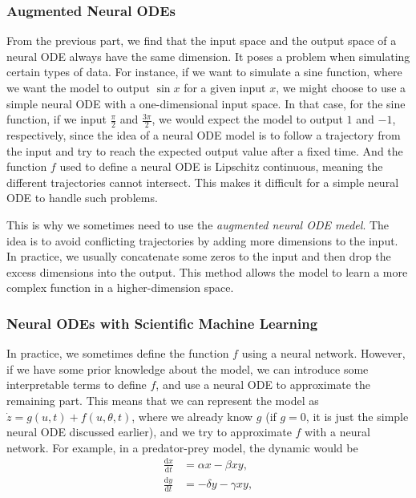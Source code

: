\documentclass[a4paper,11pt,titlepage]{article}
\theoremstyle{definition}
\theoremstyle{plain}
\theoremstyle{remark}
\begin{document}
\subsubsection{Augmented Neural ODEs}

From the previous part, we find that the input space and the output space of a neural ODE always have the same dimension. It poses a problem when simulating certain types of data. For instance, if we want to simulate a sine function, where we want the model to output $\sin x$ for a given input $x$, we might choose to use a simple neural ODE with a one-dimensional input space. In that case, for the sine function, if we input $\frac{\pi}{2}$ and $\frac{3\pi}{2}$, we would expect the model to output $1$ and $-1$, respectively, since the idea of a neural ODE model is to follow a trajectory from the input and try to reach the expected output value after a fixed time. And the function $f$ used to define a neural ODE is Lipschitz continuous, meaning the different trajectories cannot intersect. This makes it difficult for a simple neural ODE to handle such problems.

This is why we sometimes need to use the \textit{augmented neural ODE medel}. The idea is to avoid conflicting trajectories by adding more dimensions to the input. In practice, we usually concatenate some zeros to the input and then drop the excess dimensions into the output. This method allows the model to learn a more complex function in a higher-dimension space.

\subsubsection{Neural ODEs with Scientific Machine Learning}

In practice, we sometimes define the function $f$ using a neural network. However, if we have some prior knowledge about the model, we can introduce some interpretable terms to define $f$, and use a neural ODE to approximate the remaining part. This means that we can represent the model as $\dot{z}=g(u,t)+f(u,\theta,t)$, where we already know $g$ (if $g=0$, it is just the simple neural ODE discussed earlier), and we try to approximate $f$ with a neural network. For example, in a predator-prey model, the dynamic would be
\begin{align*}
    \frac{\mathrm{d}x}{\mathrm{d}t}&=\alpha x-\beta xy,\\
    \frac{\mathrm{d}y}{\mathrm{d}t}&=-\delta y-\gamma xy,
\end{align*}
\end{document}
